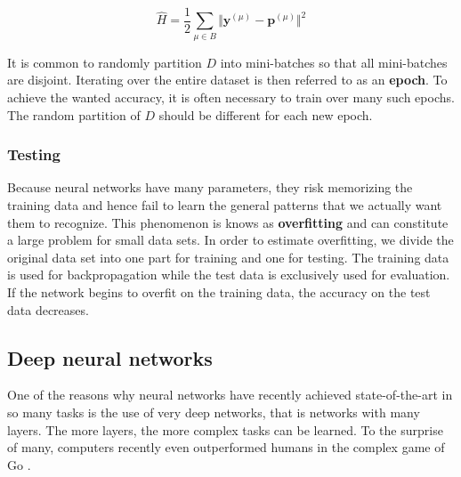 \[
\hat{H} = \frac{1}{2} \sum_{\mu \in B} \Vert
  \mathbf{y}^{(\mu)} - \mathbf{p}^{(\mu)}
\Vert ^2
\]

It is common to randomly partition $D$ into mini-batches so that all mini-batches are disjoint. Iterating over the entire dataset is then referred to as an \textbf{epoch}.
To achieve the wanted accuracy, it is often necessary to train over many such epochs.
The random partition of $D$ should be different for each new epoch.




\subsubsection{Testing}

Because neural networks have many parameters, they risk memorizing the training data and hence fail to learn the general patterns that we actually want them to recognize.
This phenomenon is knows as \textbf{overfitting} and can constitute a large problem for small data sets. In order to estimate overfitting, we divide the original data set into one part for training and one for testing. The training data is used for backpropagation while the test data is exclusively used for evaluation. If the network begins to overfit on the training data, the accuracy on the test data decreases.


\subsection{Deep neural networks}

One of the reasons why neural networks have recently achieved state-of-the-art in so many tasks is the use of very deep networks, that is networks with many layers.
The more layers, the more complex tasks can be learned. To the surprise of many, computers recently even outperformed humans in the complex game of Go \cite{AlphaGo, AlphaGoTuringTest}.

